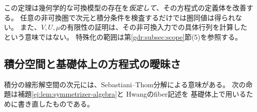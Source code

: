 \begin{remark}[存在証明と実計算の違い]\label{gcd:rem:limits}
この定理は幾何学的な可換模型の存在を\emph{仮定して}、その方程式の定義体を改善する。
任意の非可換圏で次元と積分条件を検査するだけでは圏同値は得られない。
また、$V,U,\mu$の有限性の証明は、その非可換入力での具体行列を計算したという意味ではない。
特殊化の範囲は第\ref{gdr:subsec:scope}節(5)を参照する。
\end{remark}

\subsection{積分空間と基礎体上の方程式の曖昧さ}

積分の線形解空間の次元には、Sebastiani--Thom分解による意味がある。
次の命題は補題\ref{ej:lem:symmetrizer-algebra}と
Hwang\cite[Proposition~2.6, Corollary~2.7]{HwangSymmetrizer}のfiber記述を
基礎体上で用いるために書き直したものである。

